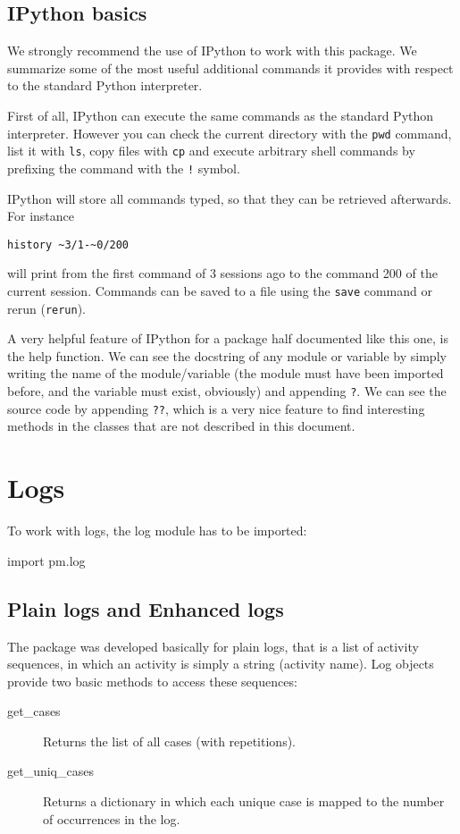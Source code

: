 \documentclass[a4paper,10pt]{book}
\begin{document}
\section{IPython basics}

We strongly recommend the use of IPython to work with this package. We summarize some of the most useful additional commands it provides with respect to the standard Python interpreter.

First of all, IPython can execute the same commands as the standard Python interpreter. However you can check the current directory with the \texttt{pwd} command, list it with \texttt{ls}, copy files with \texttt{cp} and execute arbitrary shell commands by prefixing the command with the \texttt{!} symbol.

IPython will store all commands typed, so that they can be retrieved afterwards. For instance 
\begin{verbatim}
history ~3/1-~0/200
\end{verbatim}
will print from the first command of 3 sessions ago to the command 200 of the current session. Commands can be saved to a file using the \texttt{save} command or rerun (\texttt{rerun}).

A very helpful feature of IPython for a package half documented like this one, is the help function. We can see the docstring of any module or variable by simply writing the name of the module/variable (the module must have been imported before, and the variable must exist, obviously) and appending \texttt{?}. We can see the source code by appending \texttt{??}, which is a very nice feature to find interesting methods in the classes that are not described in this document.

\chapter{Logs}
To work with logs, the log module has to be imported:\\
\begin{pycode}
import pm.log  
\end{pycode}

\section{Plain logs and Enhanced logs}
The package was developed basically for plain logs, that is a list of activity sequences, in which an activity is simply a string (activity name). Log objects provide two basic methods to access these sequences:
\begin{description}
 \item [get\_cases] Returns the list of all cases (with repetitions).
 \item [get\_uniq\_cases] Returns a dictionary in which each unique case is mapped to the number of occurrences in the log.
\end{description}
\end{document}
